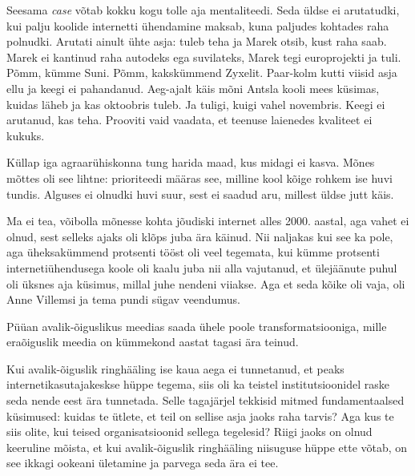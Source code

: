
Seesama \emph{case} võtab kokku kogu tolle aja mentaliteedi. 
Seda üldse ei arutatudki, kui palju koolide internetti 
ühendamine maksab, kuna paljudes kohtades raha polnudki. 
Arutati ainult ühte asja: tuleb teha ja Marek otsib, kust raha saab. Marek ei kantinud raha autodeks ega suvilateks, Marek tegi europrojekti ja tuli. Põmm, kümme 
Suni. Põmm, kakskümmend Zyxelit. Paar-kolm kutti viisid asja ellu ja 
keegi ei pahandanud. Aeg-ajalt käis mõni Antsla kooli mees 
küsimas, kuidas läheb ja kas oktoobris tuleb. Ja tuligi, kuigi vahel 
novembris. Keegi ei arutanud, kas teha. Prooviti vaid vaadata, et teenuse laienedes kvaliteet ei kukuks. 


Küllap iga agraarühiskonna tung harida maad, kus midagi ei kasva. Mõnes mõttes oli see lihtne: prioriteedi määras 
see, milline kool kõige rohkem ise huvi tundis. Alguses ei olnudki huvi suur, sest ei saadud aru, millest üldse jutt käis.


Ma ei tea, võibolla mõnesse kohta jõudiski internet alles 2000. aastal, aga 
vahet ei olnud, sest selleks ajaks oli klõps juba 
ära käinud. Nii naljakas kui see ka pole, aga üheksakümmend protsenti tööst oli 
veel tegemata, kui kümme protsenti internetiühendusega koole oli kaalu juba 
nii alla vajutanud, et ülejäänute puhul oli üksnes aja küsimus, millal juhe nendeni 
viiakse. Aga et seda kõike oli vaja, oli Anne Villemsi ja tema pundi sügav veendumus. 


Püüan avalik-õiguslikus meedias saada ühele poole transformatsiooniga, mille eraõiguslik meedia on kümmekond aastat tagasi ära teinud.


Kui avalik-õiguslik ringhääling ise kaua aega ei 
tunnetanud, et peaks internetikasutajakeskse hüppe tegema, 
siis oli ka teistel institutsioonidel raske seda nende eest ära 
tunnetada. Selle tagajärjel tekkisid mitmed fundamentaalsed küsimused: 
kuidas te ütlete, et teil on sellise asja jaoks raha tarvis? Aga kus te siis 
olite, kui teised organisatsioonid sellega tegelesid? Riigi jaoks on olnud keeruline 
mõista, et kui avalik-õiguslik ringhääling niisuguse hüppe ette võtab, on see
ikkagi ookeani ületamine ja parvega seda ära ei tee.

